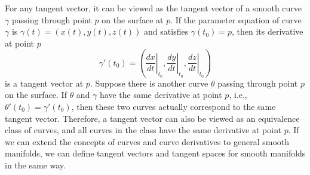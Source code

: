 \documentclass{report}
\begin{document}
For any tangent vector, it can be viewed as the tangent vector of a smooth curve $\gamma$ passing through point $p$ on the surface at $p$. If the parameter equation of curve $\gamma$ is $\gamma(t)=(x(t),y(t),z(t))$ and satisfies $\gamma(t_0)=p$, then its derivative at point $p$
\[
    \gamma'(t_0)=\left(\left.\frac{dx}{dt}\right|_{t_0},\left.\frac{dy}{dt}\right|_{t_0}, \left.\frac{dz}{dt}\right|_{t_0}\right)
\]
is a tangent vector at $p$. Suppose there is another curve $\theta$ passing through point $p$ on the surface. If $\theta$ and $\gamma$ have the same derivative at point $p$, i.e., $\theta'(t_0)=\gamma'(t_0)$, then these two curves actually correspond to the same tangent vector. Therefore, a tangent vector can also be viewed as an equivalence class of curves, and all curves in the class have the same derivative at point $p$. If we can extend the concepts of curves and curve derivatives to general smooth manifolds, we can define tangent vectors and tangent spaces for smooth manifolds in the same way.
\end{document}
